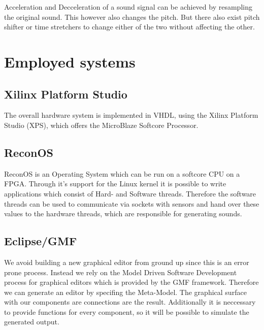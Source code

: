				Acceleration and Decceleration of a sound signal can be achieved by resampling the original sound. This however also changes the pitch.
				But there also exist pitch shifter or time stretchers to change either of the two without affecting the other.
		
		
		
			
			
			
		
	\section{Employed systems}
	  \subsection{Xilinx Platform Studio}
	    The overall hardware system is implemented in VHDL, using the Xilinx Platform Studio (XPS), which offers the MicroBlaze Softcore Processor.
	  \subsection{ReconOS}
		ReconOS is an Operating System which can be run on a softcore CPU on a FPGA. Through it's support for the Linux kernel it is possible to write applications which consist of Hard- and Software threads. Therefore the software threads can be used to communicate via sockets with sensors and hand over these values to the hardware threads, which are responsible for generating sounds.
	  \subsection{Eclipse/GMF}
		We avoid building a new graphical editor from ground up since this is an error prone process. Instead we rely on the Model Driven Software Development process for graphical editors which is provided by the GMF framework. Therefore we can generate an editor by specifing the Meta-Model. The graphical surface with our components are connections are the result. Additionally it is neccessary to provide functions for every component, so it will be possible to simulate the generated output.
      